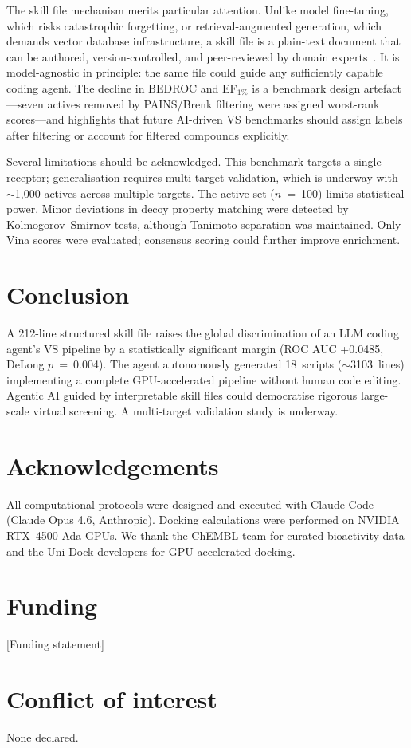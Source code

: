 \documentclass[10pt,a4paper,twocolumn]{article}
\newcommand{\NSCRIPTS}{18}
\newcommand{\NLINES}{3103}
\newcommand{\NSKILLLINES}{212}
\begin{document}
The skill file mechanism merits particular attention. Unlike model fine-tuning, which risks catastrophic forgetting, or retrieval-augmented generation, which demands vector database infrastructure, a skill file is a plain-text document that can be authored, version-controlled, and peer-reviewed by domain experts~\citep{claudecode2024}. It is model-agnostic in principle: the same file could guide any sufficiently capable coding agent. The decline in BEDROC and EF$_{1\%}$ is a benchmark design artefact---seven actives removed by PAINS/Brenk filtering were assigned worst-rank scores---and highlights that future AI-driven VS benchmarks should assign labels after filtering or account for filtered compounds explicitly.

Several limitations should be acknowledged. This benchmark targets a single receptor; generalisation requires multi-target validation, which is underway with $\sim$1,000 actives across multiple targets. The active set ($n$~=~100) limits statistical power. Minor deviations in decoy property matching were detected by Kolmogorov--Smirnov tests, although Tanimoto separation was maintained. Only Vina scores were evaluated; consensus scoring could further improve enrichment.

\section*{Conclusion}

A \NSKILLLINES{}-line structured skill file raises the global discrimination of an LLM coding agent's VS pipeline by a statistically significant margin (ROC AUC +0.0485, DeLong $p$~=~0.004). The agent autonomously generated \NSCRIPTS{}~scripts ($\sim$\NLINES{}~lines) implementing a complete GPU-accelerated pipeline without human code editing. Agentic AI guided by interpretable skill files could democratise rigorous large-scale virtual screening. A multi-target validation study is underway.

\section*{Acknowledgements}

All computational protocols were designed and executed with Claude Code (Claude Opus 4.6, Anthropic). Docking calculations were performed on NVIDIA RTX~4500 Ada GPUs. We thank the ChEMBL team for curated bioactivity data and the Uni-Dock developers for GPU-accelerated docking.

\section*{Funding}

[Funding statement]

\section*{Conflict of interest}

None declared.


\end{document}
